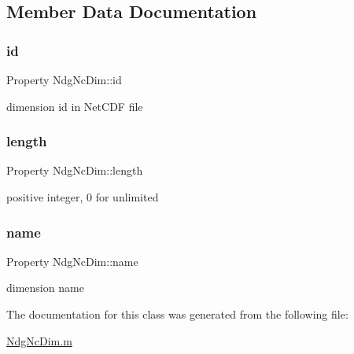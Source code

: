\subsection{Member Data Documentation}
\mbox{\label{class_ndg_nc_dim_ab5bdbcb5bc55a3557e7d8a902e8dad7e}} 
\subsubsection{\texorpdfstring{id}{id}}
{\footnotesize\ttfamily Property Ndg\+Nc\+Dim\+::id\hspace{0.3cm}{\ttfamily [private]}}



dimension id in Net\+C\+DF file 

\mbox{\label{class_ndg_nc_dim_a08430bf2264f06c738e7e5a0a94fa577}} 
\subsubsection{\texorpdfstring{length}{length}}
{\footnotesize\ttfamily Property Ndg\+Nc\+Dim\+::length\hspace{0.3cm}{\ttfamily [private]}}



positive integer, 0 for unlimited 

\mbox{\label{class_ndg_nc_dim_a9dc41cf16574a93a3eebd9419bd99a98}} 
\subsubsection{\texorpdfstring{name}{name}}
{\footnotesize\ttfamily Property Ndg\+Nc\+Dim\+::name\hspace{0.3cm}{\ttfamily [private]}}



dimension name 



The documentation for this class was generated from the following file\+:\begin{DoxyCompactItemize}
\item 
\hyperlink{_ndg_nc_dim_8m}{Ndg\+Nc\+Dim.\+m}\end{DoxyCompactItemize}
